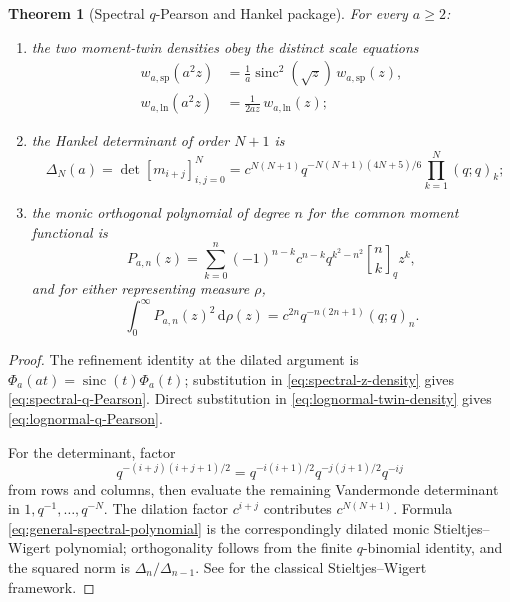 \documentclass[11pt,oneside]{article}
\newtheorem{theorem}{Theorem}[section]
\theoremstyle{definition}
\theoremstyle{remark}
\newcommand{\sinc}{\operatorname{sinc}}
\newcommand{\dd}{\,\mathrm d}
\newcommand{\qbinom}[2]{\genfrac{[}{]}{0pt}{}{#1}{#2}_q}
\begin{document}
\begin{theorem}[Spectral $q$-Pearson and Hankel package]
\label{thm:spectral-q-package}
For every $a\ge2$:
\begin{enumerate}
\item the two moment-twin densities obey the distinct scale equations
      \begin{align}
       w_{a,\mathrm{sp}}(a^2z)
       &=\frac1a\sinc^2(\sqrt z)\,w_{a,\mathrm{sp}}(z),
       \label{eq:spectral-q-Pearson}\\
       w_{a,\mathrm{ln}}(a^2z)
       &=\frac1{2az}\,w_{a,\mathrm{ln}}(z);
       \label{eq:lognormal-q-Pearson}
      \end{align}
\item the Hankel determinant of order $N+1$ is
      \begin{equation}
       \boxed{\quad
       \Delta_N(a)=\det[m_{i+j}]_{i,j=0}^{N}
       =c^{N(N+1)}q^{-N(N+1)(4N+5)/6}
        \prod_{k=1}^{N}(q;q)_k;
       \quad}
       \label{eq:general-spectral-Hankel}
      \end{equation}
\item the monic orthogonal polynomial of degree $n$ for the common moment functional is
      \begin{equation}
       \boxed{\quad
       P_{a,n}(z)=\sum_{k=0}^{n}(-1)^{n-k}c^{n-k}
       q^{k^2-n^2}\qbinom{n}{k} z^k,
       \quad}
       \label{eq:general-spectral-polynomial}
      \end{equation}
      and for either representing measure $\rho$,
      \begin{equation}
       \int_0^\infty P_{a,n}(z)^2\dd\rho(z)
       =c^{2n}q^{-n(2n+1)}(q;q)_n.
       \label{eq:general-spectral-polynomial-norm}
      \end{equation}
\end{enumerate}
\end{theorem}

\begin{proof}
The refinement identity at the dilated argument is
$\Phi_a(at)=\sinc(t)\Phi_a(t)$; substitution in
\eqref{eq:spectral-z-density} gives \eqref{eq:spectral-q-Pearson}.  Direct substitution in
\eqref{eq:lognormal-twin-density} gives \eqref{eq:lognormal-q-Pearson}.

For the determinant, factor
\[
 q^{-(i+j)(i+j+1)/2}
 =q^{-i(i+1)/2}q^{-j(j+1)/2}q^{-ij}
\]
from rows and columns, then evaluate the remaining Vandermonde determinant in
$1,q^{-1},\ldots,q^{-N}$.  The dilation factor $c^{i+j}$ contributes
$c^{N(N+1)}$.  Formula \eqref{eq:general-spectral-polynomial} is the correspondingly dilated
monic Stieltjes--Wigert polynomial; orthogonality follows from the finite $q$-binomial identity,
and the squared norm is $\Delta_n/\Delta_{n-1}$.  See \cite{ismail2005} for the classical
Stieltjes--Wigert framework.
\end{proof}
\end{document}
